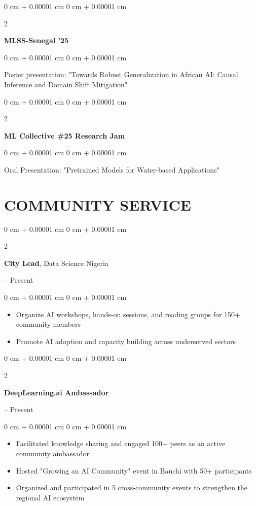 \documentclass[11pt, letterpaper]{article}
\newenvironment{onecolentry}{
    \begin{adjustwidth}{
        0 cm + 0.00001 cm
    }{
        0 cm + 0.00001 cm
    }
}{
    \end{adjustwidth}
} %
\newenvironment{twocolentry}[2][]{
    \onecolentry
    \def\secondColumn{#2}
    \setcolumnwidth{\fill, 4.5 cm}
    \begin{paracol}{2}
}{
    \switchcolumn \raggedleft \secondColumn
    \end{paracol}
    \endonecolentry
} %
\begin{document}
        \vspace{0.2 cm}

        \begin{twocolentry}{
            2025
        }
            \textbf{MLSS-Senegal '25}
        \end{twocolentry}
        \begin{onecolentry}
            Poster presentation: "Towards Robust Generalization in African AI: Causal Inference and Domain Shift Mitigation"
        \end{onecolentry}
        
        \vspace{0.2 cm}
        
        \begin{twocolentry}{
            2025
        }
            \textbf{ML Collective \#25 Research Jam}
        \end{twocolentry}
        \begin{onecolentry}
            Oral Presentation: "Pretrained Models for Water-based Applications"
        \end{onecolentry}

    \section{COMMUNITY SERVICE}
        \begin{twocolentry}{
            2024 – Present
        }
            \textbf{City Lead}, Data Science Nigeria
        \end{twocolentry}
        \begin{onecolentry}
            \begin{itemize}
                \item[-] Organize AI workshops, hands-on sessions, and reading groups for 150+ community members
                \item[-] Promote AI adoption and capacity building across underserved sectors
            \end{itemize}
        \end{onecolentry}
        
        \vspace{0.2 cm}
        
        \begin{twocolentry}{
            2023 – Present
        }
            \textbf{DeepLearning.ai Ambassador}
        \end{twocolentry}
        \begin{onecolentry}
            \begin{itemize}
                \item[-] Facilitated knowledge sharing and engaged 100+ peers as an active community ambassador
                \item[-] Hosted "Growing an AI Community" event in Bauchi with 50+ participants
                \item[-] Organized and participated in 5 cross-community events to strengthen the regional AI ecosystem
            \end{itemize}
        \end{onecolentry}
        
\end{document}
